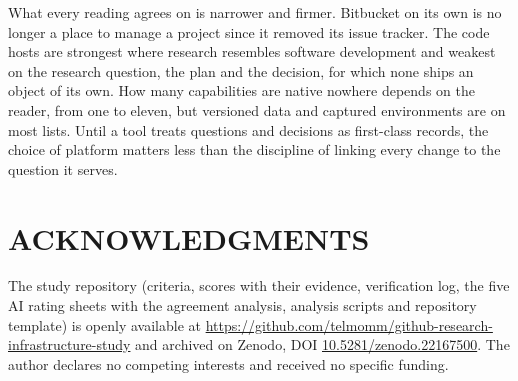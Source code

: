 \documentclass{IEEEcsmag}
\begin{document}
What every reading agrees on is narrower and firmer. Bitbucket on its own is no longer a place to manage a project since it removed its issue tracker. The code hosts are strongest where research resembles software development and weakest on the research question, the plan and the decision, for which none ships an object of its own. How many capabilities are native nowhere depends on the reader, from one to eleven, but versioned data and captured environments are on most lists. Until a tool treats questions and decisions as first-class records, the choice of platform matters less than the discipline of linking every change to the question it serves.

\section{ACKNOWLEDGMENTS}
The study repository (criteria, scores with their evidence, verification log, the five AI rating sheets with the agreement analysis, analysis scripts and repository template) is openly available at \url{https://github.com/telmomm/github-research-infrastructure-study} and archived on Zenodo, DOI \href{https://doi.org/10.5281/zenodo.22167500}{10.5281/zenodo.22167500}. The author declares no competing interests and received no specific funding.

\def\refname{REFERENCES}
\end{document}
